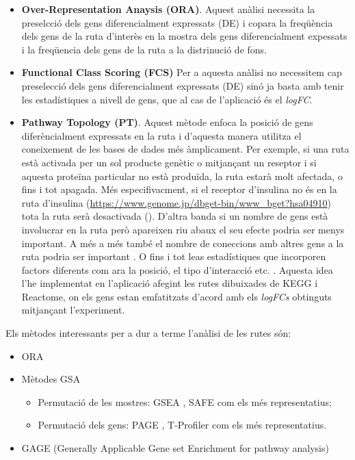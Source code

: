 \begin{itemize}
\item \textbf{Over-Representation Anaysis (ORA)}.
Aquest anàlisi necessita la preselcció dels gens diferencialment expressats (DE) i copara la freqüència dels gens de la ruta d'interès en la mostra dels gens diferencialment expessats i la freqüencia dels gens de la ruta a la distrinució de fons. 
\item \textbf{Functional Class Scoring (FCS)}
Per a aquesta anàlisi no necessitem cap preselecció dels gens diferencialment expressats (DE) sinó ja basta amb tenir les estadístiques a nivell de gens, que al cas de l'aplicació és el \textit{logFC}.
\item \textbf{Pathway Topology (PT)}.
Aquest mètode enfoca la posició de gens diferèncialment expressats en la ruta i d'aquesta manera utilitza el coneixement de les bases de dades més àmplicament. Per exemple, si una ruta està activada per un sol producte genètic o mitjançant un reseptor i si aquesta proteïna particular no està produïda, la ruta estarà molt afectada, o fins i tot apagada. Més especifivacment, si el receptor d'insulina no és en la ruta d'insulina (\url{https://www.genome.jp/dbget-bin/www_bget?hsa04910}) tota la ruta serà desactivada (\cite{tarca2008novel}). D'altra banda si un nombre de gens està involucrar en la ruta però apareixen riu abaux el seu efecte podria ser menys important. A més a més també el nombre de coneccions amb altres gens a la ruta podria ser important \cite{rahnenfuhrer2004calculating}. O fins i tot leas estadístiques que incorporen factors diferents com ara la posició, el tipo d'interacció etc. \cite{draghici2007systems}.  Aquesta idea l'he implementat en l'aplicació afegint les rutes dibuixades de KEGG i Reactome, on els gens estan emfatitzats d'acord amb els \textit{logFCs} obtinguts mitjançant l'experiment.


\end{itemize}

Els mètodes interessants per a dur a terme l'anàlisi de les rutes són:

\begin{itemize}
\item ORA \cite{boyle2004go}
\item Mètodes GSA
\begin{itemize} 
\item Permutació de les mostres: GSEA \cite{subramanian2005gene}, SAFE\cite{dinu2007improving} com els més representatius;
\item Permutació dels gens: PAGE \cite{kim2005page}, T-Profiler\cite{newton2007random} com els més representatius.
\end{itemize}
\item GAGE (Generally Applicable Gene set Enrichment for pathway analysis) \cite{luo2009gage}
\end{itemize}

